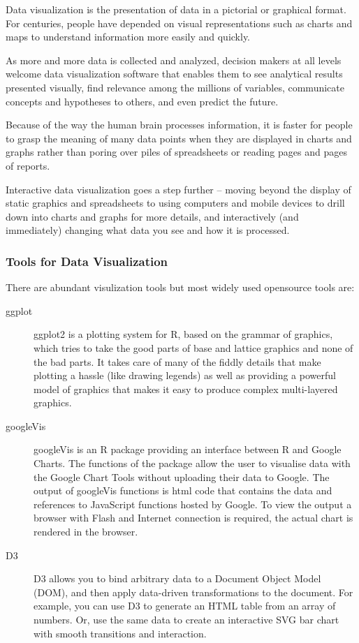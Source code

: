 Data visualization is the presentation of data in a pictorial or graphical format. For centuries, people have depended on visual representations such as charts and maps to understand information more easily and quickly.

As more and more data is collected and analyzed, decision makers at all levels welcome data visualization software that enables them to see analytical results presented visually, find relevance among the millions of variables, communicate concepts and hypotheses to others, and even predict the future.

Because of the way the human brain processes information, it is faster for people to grasp the meaning of many data points when they are displayed in charts and graphs rather than poring over piles of spreadsheets or reading pages and pages of reports.

Interactive data visualization goes a step further – moving beyond the display of static graphics and spreadsheets to using computers and mobile devices to drill down into charts and graphs for more details, and interactively (and immediately) changing what data you see and how it is processed.

\subsubsection{Tools for Data Visualization}
There are abundant visulization tools but most widely used opensource tools are:
\begin{description}
\item[ggplot] ggplot2 is a plotting system for R, based on the grammar of graphics, which tries to take the good parts of base and lattice graphics and none of the bad parts. It takes care of many of the fiddly details that make plotting a hassle (like drawing legends) as well as providing a powerful model of graphics that makes it easy to produce complex multi-layered graphics.
\item[googleVis] googleVis is an R package providing an interface between R and Google Charts. The functions of the package allow the user to visualise data with the Google Chart Tools without uploading their data to Google. The output of googleVis functions is html code that contains the data and references to JavaScript functions hosted by Google. To view the output a browser with Flash and Internet connection is required, the actual chart is rendered in the browser. 
\item[D3] D3 allows you to bind arbitrary data to a Document Object Model (DOM), and then apply data-driven transformations to the document. For example, you can use D3 to generate an HTML table from an array of numbers. Or, use the same data to create an interactive SVG bar chart with smooth transitions and interaction. 
\end{description}
